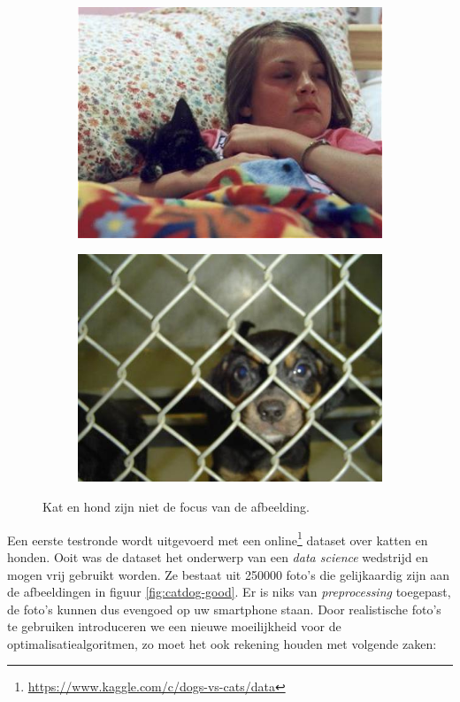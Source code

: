 \begin{figure}
    \begin{subfigure}{.5\textwidth}
        \centering
        \includegraphics[width=.8\linewidth]{img/bad_cat.jpg}
        \label{fig:cat-bad}
    \end{subfigure}%
    \begin{subfigure}{.5\textwidth}
        \centering
        \includegraphics[width=.8\linewidth]{img/bad_dog.jpg}
        \label{fig:dog-bad}
    \end{subfigure}
    \caption{Kat en hond zijn niet de focus van de afbeelding.}
    \label{fig:catdog-bad}
\end{figure}

Een eerste testronde wordt uitgevoerd met een online\footnote{\url{https://www.kaggle.com/c/dogs-vs-cats/data}} dataset over katten en honden. Ooit was de dataset het onderwerp van een \textit{data science} wedstrijd en mogen vrij gebruikt worden. Ze bestaat uit 250000 foto's die gelijkaardig zijn aan de afbeeldingen in figuur \ref{fig:catdog-good}. Er is niks van \textit{preprocessing} toegepast, de foto's kunnen dus evengoed op uw smartphone staan. Door realistische foto's te gebruiken introduceren we een nieuwe moeilijkheid voor de optimalisatiealgoritmen, zo moet het ook rekening houden met volgende zaken: 

